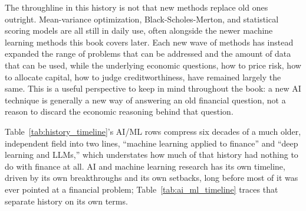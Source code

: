 \documentclass[../ai_in_finance]{subfiles}
\begin{document}
The throughline in this history is not that new methods replace old ones outright. Mean-variance optimization, Black-Scholes-Merton, and statistical scoring models are all still in daily use, often alongside the newer machine learning methods this book covers later. Each new wave of methods has instead expanded the range of problems that can be addressed and the amount of data that can be used, while the underlying economic questions, how to price risk, how to allocate capital, how to judge creditworthiness, have remained largely the same. This is a useful perspective to keep in mind throughout the book: a new AI technique is generally a new way of answering an old financial question, not a reason to discard the economic reasoning behind that question.

Table~\ref{tab:history_timeline}'s AI/ML rows compress six decades of a much older, independent field into two lines, ``machine learning applied to finance'' and ``deep learning and LLMs,'' which understates how much of that history had nothing to do with finance at all. AI and machine learning research has its own timeline, driven by its own breakthroughs and its own setbacks, long before most of it was ever pointed at a financial problem; Table~\ref{tab:ai_ml_timeline} traces that separate history on its own terms.
\end{document}
